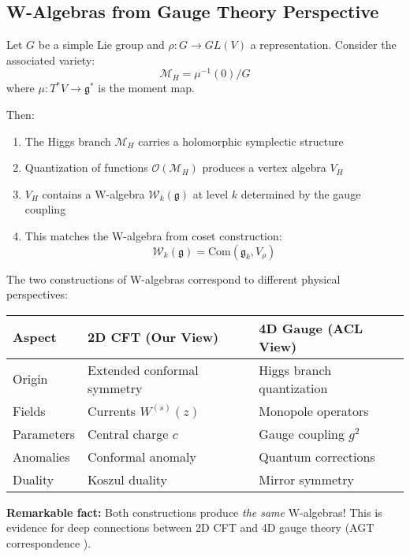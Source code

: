 \subsection{W-Algebras from Gauge Theory Perspective}

\begin{theorem}\label{thm:w-from-gauge}
\cite{ACL19} Let $G$ be a simple Lie group and $\rho: G \to GL(V)$ a 
representation. Consider the associated variety:
$$\mathcal{M}_H = \mu^{-1}(0) / G$$
where $\mu: T^*V \to \mathfrak{g}^*$ is the moment map.

Then:
\begin{enumerate}
\item The Higgs branch $\mathcal{M}_H$ carries a holomorphic symplectic structure

\item Quantization of functions $\mathcal{O}(\mathcal{M}_H)$ produces a vertex 
      algebra $V_H$
      
\item $V_H$ contains a W-algebra $\mathcal{W}_k(\mathfrak{g})$ at level $k$ 
      determined by the gauge coupling
      
\item This matches the W-algebra from coset construction: 
      $$\mathcal{W}_k(\mathfrak{g}) = \text{Com}(\mathfrak{g}_k, V_\rho)$$
\end{enumerate}
\end{theorem}

\begin{remark}\label{rem:w-physical-interpretation}
The two constructions of W-algebras correspond to different physical perspectives:

\begin{center}
\begin{tabular}{|l|l|l|}
\hline
\textbf{Aspect} & \textbf{2D CFT (Our View)} & \textbf{4D Gauge (ACL View)} \\
\hline
Origin & Extended conformal symmetry & Higgs branch quantization \\
Fields & Currents $W^{(s)}(z)$ & Monopole operators \\
Parameters & Central charge $c$ & Gauge coupling $g^2$ \\
Anomalies & Conformal anomaly & Quantum corrections \\
Duality & Koszul duality & Mirror symmetry \\
\hline
\end{tabular}
\end{center}

\textbf{Remarkable fact:} Both constructions produce \emph{the same} W-algebras! 
This is evidence for deep connections between 2D CFT and 4D gauge theory (AGT 
correspondence \cite{AGT09}).
\end{remark}

